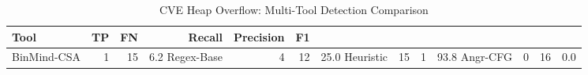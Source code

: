 \begin{table}[htbp]
\centering
\caption{CVE Heap Overflow: Multi-Tool Detection Comparison}
\label{tab:cve-multi-tool}
\begin{tabular}{lrrrrr}
\toprule
Tool & TP & FN & Recall & Precision & F1 \\
\midrule
BinMind-CSA & 1 & 15 & 6.2%
Regex-Base & 4 & 12 & 25.0%
Heuristic & 15 & 1 & 93.8%
Angr-CFG & 0 & 16 & 0.0%
\bottomrule
\end{tabular}
\end{table}

